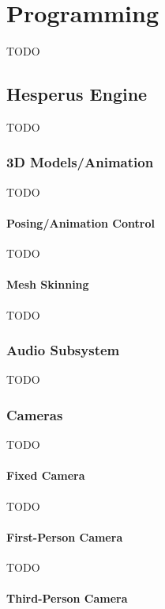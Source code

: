 \chapter{Programming}

TODO

\section{Hesperus Engine}

TODO

\subsection{3D Models/Animation}

TODO

\subsubsection{Posing/Animation Control}

TODO

\subsubsection{Mesh Skinning}

TODO

\subsection{Audio Subsystem}

TODO

\subsection{Cameras}

TODO

\subsubsection{Fixed Camera}

TODO

\subsubsection{First-Person Camera}

TODO

\subsubsection{Third-Person Camera}

